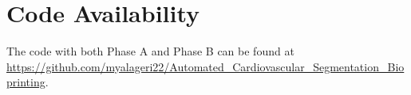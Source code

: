 \documentclass[anonymous]{iopjournal}
\begin{document}
\section{Code Availability}
The code with both Phase A and Phase B can be found at \url{https://github.com/myalageri22/Automated_Cardiovascular_Segmentation_Bioprinting}.


\newpage


\end{document}
